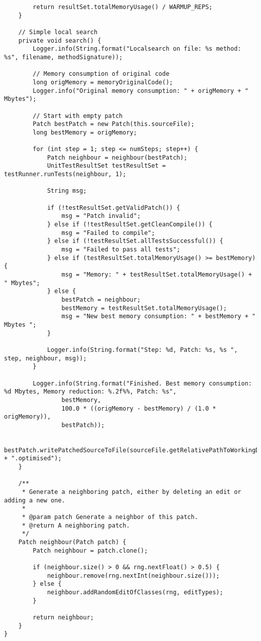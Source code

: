 \begin{lstlisting}
        return resultSet.totalMemoryUsage() / WARMUP_REPS;
    }

    // Simple local search
    private void search() {
        Logger.info(String.format("Localsearch on file: %s method: %s", filename, methodSignature));

        // Memory consumption of original code
        long origMemory = memoryOriginalCode();
        Logger.info("Original memory consumption: " + origMemory + " Mbytes");

        // Start with empty patch
        Patch bestPatch = new Patch(this.sourceFile);
        long bestMemory = origMemory;

        for (int step = 1; step <= numSteps; step++) {
            Patch neighbour = neighbour(bestPatch);
            UnitTestResultSet testResultSet = testRunner.runTests(neighbour, 1);

            String msg;

            if (!testResultSet.getValidPatch()) {
                msg = "Patch invalid";
            } else if (!testResultSet.getCleanCompile()) {
                msg = "Failed to compile";
            } else if (!testResultSet.allTestsSuccessful()) {
                msg = "Failed to pass all tests";
            } else if (testResultSet.totalMemoryUsage() >= bestMemory) {
                msg = "Memory: " + testResultSet.totalMemoryUsage() + " Mbytes";
            } else {
                bestPatch = neighbour;
                bestMemory = testResultSet.totalMemoryUsage();
                msg = "New best memory consumption: " + bestMemory + " Mbytes ";
            }

            Logger.info(String.format("Step: %d, Patch: %s, %s ", step, neighbour, msg));
        }

        Logger.info(String.format("Finished. Best memory consumption: %d Mbytes, Memory reduction: %.2f%%, Patch: %s",
                bestMemory,
                100.0 * ((origMemory - bestMemory) / (1.0 * origMemory)),
                bestPatch));

        bestPatch.writePatchedSourceToFile(sourceFile.getRelativePathToWorkingDir() + ".optimised");
    }

    /**
     * Generate a neighboring patch, either by deleting an edit or adding a new one.
     *
     * @param patch Generate a neighbor of this patch.
     * @return A neighboring patch.
     */
    Patch neighbour(Patch patch) {
        Patch neighbour = patch.clone();

        if (neighbour.size() > 0 && rng.nextFloat() > 0.5) {
            neighbour.remove(rng.nextInt(neighbour.size()));
        } else {
            neighbour.addRandomEditOfClasses(rng, editTypes);
        }

        return neighbour;
    }
}

\end{lstlisting}


